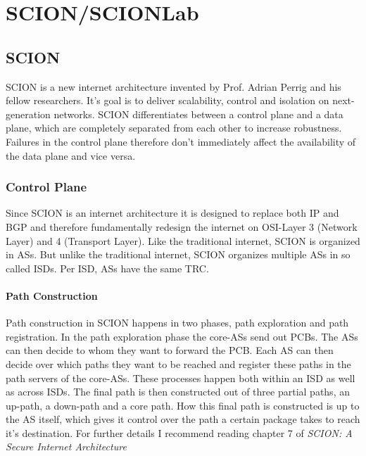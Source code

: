 \chapter{SCION/SCIONLab}
\section{SCION}
\acs{SCION} is a new internet architecture invented by Prof. Adrian Perrig and his fellow researchers. It's goal is to deliver scalability, control and isolation on next-generation networks. \acs{SCION} differentiates between a control plane and a data plane, which are completely separated from each other to increase robustness. Failures in the control plane therefore don't immediately affect the availability of the data plane and vice versa.

\subsection{Control Plane}
Since \acs{SCION} is an internet architecture it is designed to replace both \acs{IP} and \acs{BGP} and therefore fundamentally redesign the internet on \ac{OSI}-Layer 3 (Network Layer) and 4 (Transport Layer). Like the traditional internet, \acs{SCION} is organized in \aclp{AS}. But unlike the traditional internet, \acs{SCION} organizes multiple \acsp{AS} in so called \aclp{ISD}. Per \ac{ISD}, \acsp{AS} have the same \acl{TRC}.

\subsubsection{Path Construction}
Path construction in \acs{SCION} happens in two phases, path exploration and path registration. In the path exploration phase the core-\acsp{AS} send out \acp{PCB}. The \acsp{AS} can then decide to whom they want to forward the \acs{PCB}. Each \acs{AS} can then decide over which paths they want to be reached and register these paths in the path servers of the core-\acsp{AS}. These processes happen both within an \acs{ISD} as well as across \acsp{ISD}. The final path is then constructed out of three partial paths, an up-path, a down-path and a core path. How this final path is constructed is up to the \acs{AS} itself, which gives it control over the path a certain package takes to reach it's destination. For further details I recommend reading chapter 7 of \textit{SCION: A Secure Internet Architecture} \cite{perrig2017scion}

